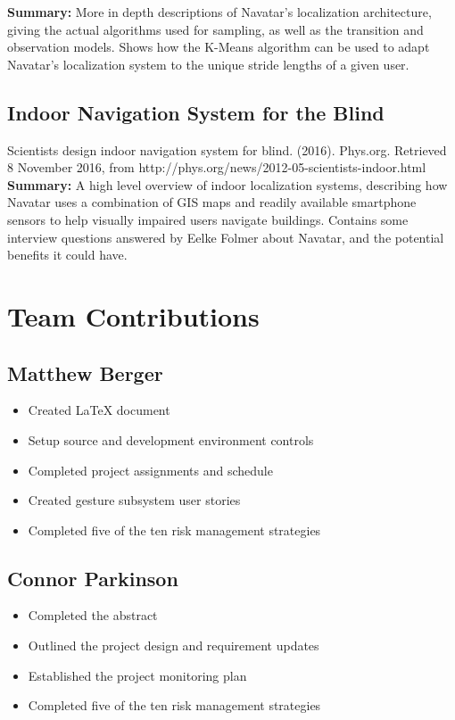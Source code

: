 \documentclass{scrreprt}
\begin{document}
\textbf{Summary:}
More in depth descriptions of Navatar's localization architecture, giving the actual algorithms used for sampling, as well as the transition and observation models. Shows how the K-Means algorithm can be used to adapt Navatar's localization system to the unique stride lengths of a given user.

\section{Indoor Navigation System for the Blind}
Scientists design indoor navigation system for blind. (2016). Phys.org. Retrieved 8 November 2016, from http://phys.org/news/2012-05-scientists-indoor.html\\

\textbf{Summary:}
A high level overview of indoor localization systems, describing how Navatar uses a combination of GIS maps and readily available smartphone sensors to help visually impaired users navigate buildings. Contains some interview questions answered by Eelke Folmer about Navatar, and the potential benefits it could have.

\chapter{Team Contributions}
	\section{Matthew Berger}
		\begin{itemize}
			\item Created LaTeX document
			\item Setup source and development environment controls
			\item Completed project assignments and schedule
			\item Created gesture subsystem user stories
			\item Completed five of the ten risk management strategies
		\end{itemize}
	\section{Connor Parkinson}
		\begin{itemize}
			\item Completed the abstract
			\item Outlined the project design and requirement updates
			\item Established the project monitoring plan
			\item Completed five of the ten risk management strategies
		\end{itemize}
\end{document}
